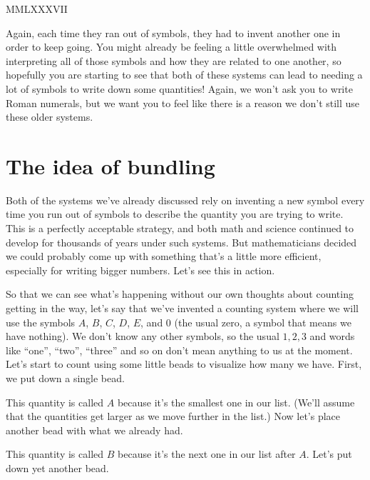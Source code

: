 \documentclass{ximera}
\begin{document}
\begin{center}
MMLXXXVII
\end{center}

Again, each time they ran out of symbols, they had to invent another one in order to keep going. You might already be feeling a little overwhelmed with interpreting all of those symbols and how they are related to one another, so hopefully you are starting to see that both of these systems can lead to needing a lot of symbols to write down some quantities! Again, we won't ask you to write Roman numerals, but we want you to feel like there is a reason we don't still use these older systems.

\section{The idea of bundling}

Both of the systems we've already discussed rely on inventing a new symbol every time you run out of symbols to describe the quantity you are trying to write. This is a perfectly acceptable strategy, and both math and science continued to develop for thousands of years under such systems. But mathematicians decided we could probably come up with something that's a little more efficient, especially for writing bigger numbers. Let's see this in action.

So that we can see what's happening without our own thoughts about counting getting in the way, let's say that we've invented a counting system where we will use the symbols $A$, $B$, $C$, $D$, $E$, and $0$ (the usual zero, a symbol that means we have nothing). We don't know any other symbols, so the usual $1, 2, 3$ and words like ``one'', ``two'', ``three'' and so on don't mean anything to us at the moment. Let's start to count using some little beads to visualize how many we have. First, we put down a single bead.

\begin{center}
\end{center}
This quantity is called $A$ because it's the smallest one in our list. (We'll assume that the quantities get larger as we move further in the list.) Now let's place another bead with what we already had.

\begin{center}
\end{center}
This quantity is called $B$ because it's the next one in our list after $A$. Let's put down yet another bead.
\end{document}
